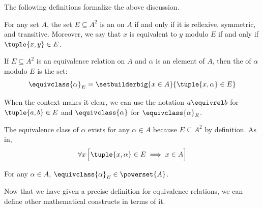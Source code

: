 \vspace{0.3cm}
\noindent
The following definitions formalize the above discussion.

\begin{dfn}
    \label{dfn:equivalence-relation}
    For any set \( A \), the set \( E \subseteq A^{2} \) is an  on \( A \)
    if and only if it is reflexive, symmetric, and transitive. Moreover, we say that \( x \) is equivalent to
    \( y \) modulo \( E \) if and only if \( \tuple{x,y} \in E \).
\end{dfn}

\begin{dfn}
    \label{dfn:equivalence-class}
    If \( E \subseteq A^{2} \) is an equivalence relation on \( A \) and \( \alpha \) is an element of \( A \),
    then the  of \( \alpha \) modulo \( E \) is the set:
    \begin{equation*}
        \equivclass{\alpha}_{E} = \setbuilderbig{x \in A}{\tuple{x,\alpha} \in E}
    \end{equation*}
\end{dfn}

\begin{rem}
    When the context makes it clear, we can use the notation \( a \equivrel b \) for \( \tuple{a,b} \in E \) and
    \( \equivclass{\alpha} \) for \( \equivclass{\alpha}_{E} \).
\end{rem}

\begin{cor}
    \label{thm:existence-of-equivalence-classes}
    The equivalence class of \( \alpha \) exists for any \( \alpha \in A \) because \( E \subseteq A^{2} \) by definition.
    As in,
    \begin{equation*}
        \forall x \, \Big[ \tuple{x,\alpha} \in E \implies x \in A \Big]
    \end{equation*}
\end{cor}

\begin{cor}
    \label{thm:equivalence-class-belongs-to-the-power-set}
    For any \( \alpha \in A \), \( \equivclass{\alpha}_{E} \in \powerset{A} \).
\end{cor}

\vspace{0.2cm}
\noindent
Now that we have given a precise definition for equivalence relations, we can define other mathematical constructs
in terms of it.

